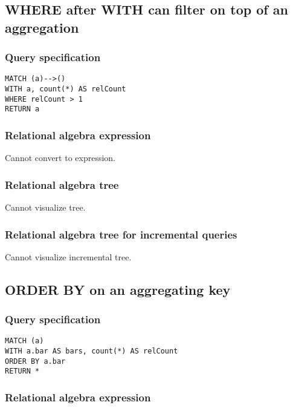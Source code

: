 \subsection{WHERE after WITH can filter on top of an aggregation}

\subsubsection*{Query specification}

\begin{lstlisting}
MATCH (a)-->()
WITH a, count(*) AS relCount
WHERE relCount > 1
RETURN a
\end{lstlisting}

\subsubsection*{Relational algebra expression}

Cannot convert to expression.

\subsubsection*{Relational algebra tree}

Cannot visualize tree.

\subsubsection*{Relational algebra tree for incremental queries}

Cannot visualize incremental tree.

\subsection{ORDER BY on an aggregating key}

\subsubsection*{Query specification}

\begin{lstlisting}
MATCH (a)
WITH a.bar AS bars, count(*) AS relCount
ORDER BY a.bar
RETURN *
\end{lstlisting}

\subsubsection*{Relational algebra expression}


